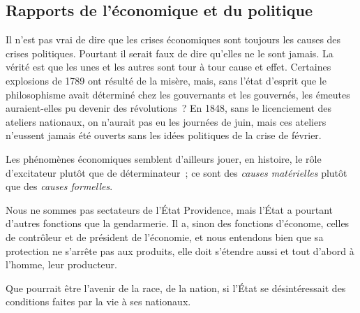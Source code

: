 \documentclass[french,twoside]{book} %
\newcommand{\astermono}{\medskip\centerline{\color{rubric}\large\selectfont{\syms ✻}}\medskip\par}%
\begin{document}
\astermono

\subsection[{Rapports de l’économique et du politique}]{Rapports de l’économique et du politique}
\noindent Il n’est pas vrai de dire que les crises économiques sont toujours les causes des crises politiques. Pourtant il serait faux de dire qu’elles ne le sont jamais. La vérité est que les unes et les autres sont tour à tour cause et effet. Certaines explosions de 1789 ont résulté de la misère, mais, sans l’état d’esprit que le philosophisme avait déterminé chez les gouvernants et les gouvernés, les émeutes auraient-elles pu devenir des révolutions ? En 1848, sans le licenciement des ateliers nationaux, on n’aurait pas eu les journées de juin, mais ces ateliers n’eussent jamais été ouverts sans les idées politiques de la crise de février.\par
Les phénomènes économiques semblent d’ailleurs jouer, en histoire, le rôle d’excitateur plutôt que de déterminateur ; ce sont des \emph{causes matérielles} plutôt que des \emph{causes formelles}.\par

\astermono

\noindent Nous ne sommes pas sectateurs de l’État Providence, mais l’État a pourtant d’autres fonctions que la gendarmerie. Il a, sinon des fonctions d’économe, celles de contrôleur et de président de l’économie, et nous entendons bien que sa protection ne s’arrête pas aux produits, elle doit s’étendre aussi et tout d’abord à l’homme, leur producteur.\par
Que pourrait être l’avenir de la race, de la nation, si l’État se désintéressait des conditions faites par la vie à ses nationaux.\par

\astermono
\end{document}
